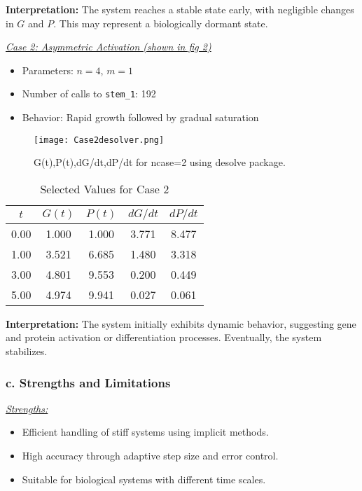 \documentclass[journal]{IEEEtran}
\begin{document}
\textbf{Interpretation:} The system reaches a stable state early, with negligible changes in $G$ and $P$. This may represent a biologically dormant state.




\underline{\textit{Case 2: Asymmetric Activation (shown in fig 2)}}
\begin{itemize}
    \item Parameters: \( n = 4 \), \( m = 1 \)
    \item Number of calls to \texttt{stem\_1}: 192
    \item Behavior: Rapid growth followed by gradual saturation
\end{itemize}
\begin{figure}[H]%
\begin {center}
\texttt{[image: Case2desolver.png]}
\caption{ G(t),P(t),dG/dt,dP/dt for  ncase=2 using desolve package. }
\label{fig:ecg}
\end {center}
\end{figure}

\begin{table}[H]
\centering
\caption{Selected Values for Case 2}
\begin{tabular}{@{}ccccc@{}}
\toprule
$t$ & $G(t)$ & $P(t)$ & $dG/dt$ & $dP/dt$ \\
\midrule
0.00 & 1.000 & 1.000 & 3.771 & 8.477 \\
1.00 & 3.521 & 6.685 & 1.480 & 3.318 \\
3.00 & 4.801 & 9.553 & 0.200 & 0.449 \\
5.00 & 4.974 & 9.941 & 0.027 & 0.061 \\
\bottomrule
\end{tabular}
\end{table}

\textbf{Interpretation:} The system initially exhibits dynamic behavior, suggesting gene and protein activation or differentiation processes. Eventually, the system stabilizes.

\vspace{1em}


\subsubsection*{\textbf{c. Strengths and Limitations}} \hfill

\underline{\textit{Strengths:}}
\begin{itemize}
    \item Efficient handling of stiff systems using implicit methods.
    \item High accuracy through adaptive step size and error control.
    \item Suitable for biological systems with different time scales.
\end{itemize}
\end{document}
